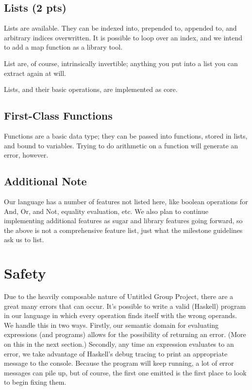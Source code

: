 \documentclass{article}
\begin{document}
\subsection*{Lists (2 pts)}
Lists are available.  They can be indexed into, prepended to, appended to, and arbitrary indices overwritten.  It is possible to loop over an index, and we intend to add a map function as a library tool.

List are, of course, intrinsically invertible; anything you put into a list you can extract again at will.

Lists, and their basic operations, are implemented as core.

\subsection*{First-Class Functions}
Functions are a basic data type; they can be passed into functions, stored in lists, and bound to variables.  Trying to do arithmetic on a function will generate an error, however.

\subsection*{Additional Note}
Our language has a number of features not listed here, like boolean operations for And, Or, and Not, equality evaluation, etc.  We also plan to continue implementing additional features as sugar and library features going forward, so the above is not a comprehensive feature list, just what the milestone guidelines ask us to list.

\section*{Safety}

Due to the heavily composable nature of Untitled Group Project, there are a great many errors that can occur.  It's possible to write a valid (Haskell) program in our language in which every operation finds itself with the wrong operands.  We handle this in two ways.  Firstly, our semantic domain for evaluating expressions (and programs) allows for the possibility of returning an error.  (More on this in the next section.)  Secondly, any time an expression evaluates to an error, we take advantage of Haskell's debug tracing to print an appropriate message to the console.  Because the program will keep running, a lot of error messages can pile up, but of course, the first one emitted is the first place to look to begin fixing them.
\end{document}

